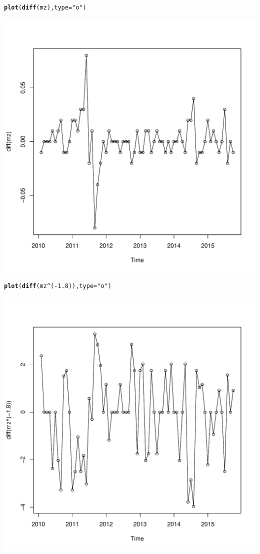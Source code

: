\documentclass{article}\usepackage[]{graphicx}\usepackage[]{color}
\makeatletter
\def\maxwidth{ %
  \ifdim\Gin@nat@width>\linewidth
    \linewidth
  \else
    \Gin@nat@width
  \fi
}
\newcommand{\hlnum}[1]{\textcolor[rgb]{0.686,0.059,0.569}{#1}}%
\newcommand{\hlstr}[1]{\textcolor[rgb]{0.192,0.494,0.8}{#1}}%
\newcommand{\hlopt}[1]{\textcolor[rgb]{0,0,0}{#1}}%
\newcommand{\hlstd}[1]{\textcolor[rgb]{0.345,0.345,0.345}{#1}}%
\newcommand{\hlkwc}[1]{\textcolor[rgb]{0.333,0.667,0.333}{#1}}%
\newcommand{\hlkwd}[1]{\textcolor[rgb]{0.737,0.353,0.396}{\textbf{#1}}}%
\newenvironment{kframe}{%
 \def\at@end@of@kframe{}%
 \ifinner\ifhmode%
  \def\at@end@of@kframe{\end{minipage}}%
  \begin{minipage}{\columnwidth}%
 \fi\fi%
 \def\FrameCommand##1{\hskip\@totalleftmargin \hskip-\fboxsep
 \colorbox{shadecolor}{##1}\hskip-\fboxsep
     \hskip-\linewidth \hskip-\@totalleftmargin \hskip\columnwidth}%
 \MakeFramed {\advance\hsize-\width
   \@totalleftmargin\z@ \linewidth\hsize
   \@setminipage}}%
 {\par\unskip\endMakeFramed%
 \at@end@of@kframe}
\newenvironment{knitrout}{}{} %
\makeatother
\begin{document}
\begin{knitrout}
\begin{kframe}\begin{alltt}
\hlkwd{plot}\hlstd{(}\hlkwd{diff}\hlstd{(mz),}\hlkwc{type}\hlstd{=}\hlstr{"o"}\hlstd{)}
\end{alltt}
\end{kframe}
\includegraphics[width=\maxwidth]{figure/unnamed-chunk-2-3} 
\begin{kframe}\begin{alltt}
\hlkwd{plot}\hlstd{(}\hlkwd{diff}\hlstd{(mz}\hlopt{^}\hlstd{(}\hlopt{-}\hlnum{1.8}\hlstd{)),}\hlkwc{type}\hlstd{=}\hlstr{"o"}\hlstd{)}
\end{alltt}
\end{kframe}
\includegraphics[width=\maxwidth]{figure/unnamed-chunk-2-4} 

\end{knitrout}
\end{document}
